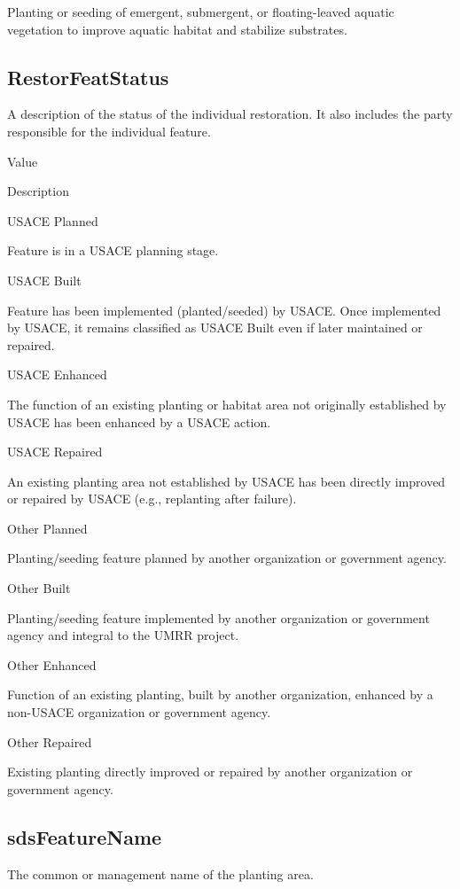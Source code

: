 \documentclass[
  letterpaper,
  DIV=11,
  numbers=noendperiod]{scrreprt}
\begin{document}
Planting or seeding of emergent, submergent, or floating-leaved aquatic
vegetation to improve aquatic habitat and stabilize substrates.

\subsection{RestorFeatStatus}\label{restorfeatstatus-4}

A description of the status of the individual restoration. It also
includes the party responsible for the individual feature.

Value

Description

USACE Planned

Feature is in a USACE planning stage.

USACE Built

Feature has been implemented (planted/seeded) by USACE. Once implemented
by USACE, it remains classified as USACE Built even if later maintained
or repaired.

USACE Enhanced

The function of an existing planting or habitat area not originally
established by USACE has been enhanced by a USACE action.

USACE Repaired

An existing planting area not established by USACE has been directly
improved or repaired by USACE (e.g., replanting after failure).

Other Planned

Planting/seeding feature planned by another organization or government
agency.

Other Built

Planting/seeding feature implemented by another organization or
government agency and integral to the UMRR project.

Other Enhanced

Function of an existing planting, built by another organization,
enhanced by a non-USACE organization or government agency.

Other Repaired

Existing planting directly improved or repaired by another organization
or government agency.

\subsection{sdsFeatureName}\label{sdsfeaturename-4}

The common or management name of the planting area.
\end{document}
